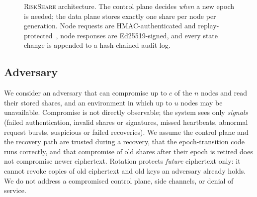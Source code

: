 \documentclass[conference]{IEEEtran}
\newcommand{\RS}{\textsc{RiskShare}}
\begin{document}
\begin{figure}[t]
\caption{\RS{} architecture. The control plane decides \emph{when} a new epoch is needed; the data plane stores exactly one share per node per generation. Node requests are HMAC-authenticated and replay-protected~\cite{rfc2104}, node responses are Ed25519-signed, and every state change is appended to a hash-chained audit log.}
\label{fig:arch}
\end{figure}

\subsection{Adversary}
We consider an adversary that can compromise up to $c$ of the $n$ nodes and read their stored shares, and an environment in which up to $u$ nodes may be unavailable. Compromise is not directly observable; the system sees only \emph{signals} (failed authentication, invalid shares or signatures, missed heartbeats, abnormal request bursts, suspicious or failed recoveries). We assume the control plane and the recovery path are trusted during a recovery, that the epoch-transition code runs correctly, and that compromise of old shares after their epoch is retired does not compromise newer ciphertext. Rotation protects \emph{future} ciphertext only: it cannot revoke copies of old ciphertext and old keys an adversary already holds. We do not address a compromised control plane, side channels, or denial of service.
\end{document}
